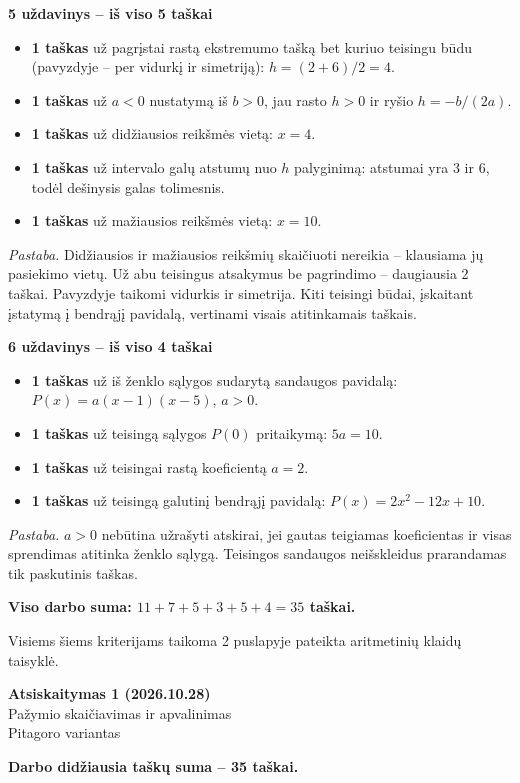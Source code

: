\documentclass[11pt]{article}
\newcommand{\antraste}[1]{\begin{center}\Large\textbf{Atsiskaitymas 1 (2026.10.28)}\\\large #1\\\normalsize Pitagoro variantas\end{center}}
\newcommand{\sk}[1]{\par\medskip\textbf{#1}\par}
\begin{document}
\sk{5 uždavinys -- iš viso 5 taškai}
\begin{itemize}
\item \textbf{1 taškas} už pagrįstai rastą ekstremumo tašką bet kuriuo teisingu būdu (pavyzdyje -- per vidurkį ir simetriją):
$h=(2+6)/2=4$.
\item \textbf{1 taškas} už $a<0$ nustatymą iš $b>0$, jau rasto $h>0$ ir ryšio $h=-b/(2a)$.
\item \textbf{1 taškas} už didžiausios reikšmės vietą:
$x=4$.
\item \textbf{1 taškas} už intervalo galų atstumų nuo $h$ palyginimą: atstumai yra $3$ ir $6$, todėl dešinysis galas tolimesnis.
\item \textbf{1 taškas} už mažiausios reikšmės vietą:
$x=10$.
\end{itemize}
\textit{Pastaba.} Didžiausios ir mažiausios reikšmių skaičiuoti nereikia -- klausiama jų pasiekimo vietų. Už abu teisingus atsakymus be pagrindimo -- daugiausia 2 taškai. Pavyzdyje taikomi vidurkis ir simetrija. Kiti teisingi būdai, įskaitant įstatymą į bendrąjį pavidalą, vertinami visais atitinkamais taškais.
\begin{center}\end{center}

\sk{6 uždavinys -- iš viso 4 taškai}
\begin{itemize}
\item \textbf{1 taškas} už iš ženklo sąlygos sudarytą sandaugos pavidalą:
$P(x)=a(x-1)(x-5)$, $a>0$.
\item \textbf{1 taškas} už teisingą sąlygos $P(0)$ pritaikymą:
$5a=10$.
\item \textbf{1 taškas} už teisingai rastą koeficientą $a=2$.
\item \textbf{1 taškas} už teisingą galutinį bendrąjį pavidalą:
$P(x)=2x^2-12x+10$.
\end{itemize}
\textit{Pastaba.} $a>0$ nebūtina užrašyti atskirai, jei gautas teigiamas koeficientas ir visas sprendimas atitinka ženklo sąlygą. Teisingos sandaugos neišskleidus prarandamas tik paskutinis taškas.
\begin{center}\end{center}
\medskip\textbf{Viso darbo suma: $11+7+5+3+5+4=35$ taškai.}

Visiems šiems kriterijams taikoma 2 puslapyje pateikta aritmetinių klaidų taisyklė.
\newpage
\antraste{Pažymio skaičiavimas ir apvalinimas}
\textbf{Darbo didžiausia taškų suma -- 35 taškai.}
\end{document}
